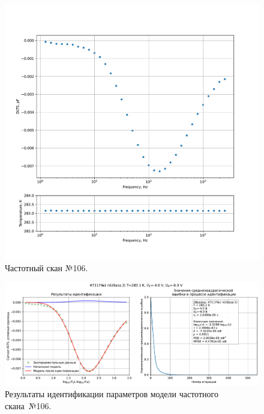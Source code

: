 \begin{figure}[!ht]
    \centering
    \includegraphics[width=1\textwidth]{../plots/КТ117№1_п1(база 2)_2500Гц-1Гц_1пФ_+10С_-4В-8В_100мВ_20мкс_шаг_0,1.pdf}
    \caption{Частотный скан №106.}
    \label{pic:frequency_scan_106}
\end{figure}

\begin{figure}[!ht]
    \centering
    \includegraphics[width=1\textwidth]{../plots/КТ117№1_п1(база 2)_2500Гц-1Гц_1пФ_+10С_-4В-8В_100мВ_20мкс_шаг_0,1_model.pdf}
    \caption{Результаты идентификации параметров модели частотного скана~№106.}
    \label{pic:frequency_scan_model106}
\end{figure}

\pagebreak


